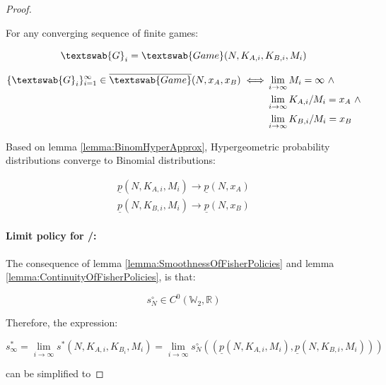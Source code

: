 \documentclass{article}
\theoremstyle{definition}
\begin{document}
\begin{proof}
\label{proof:BinomialFisher}


For any converging sequence of finite games:

\begin{equation}
    \textswab{G}_i = \textswab{Game}(N, K_{A,i}, K_{B,i}, M_i)
\end{equation}

\begin{equation}
    \begin{split}
        \{\textswab{G}_i\}_{i=1}^\infty \in \overline{\textswab{Game}}(N, x_A, x_B) \iff & \lim_{i\to \infty} M_i = \infty \ \wedge \\ 
        & \lim_{i\to \infty} K_{A,i}/M_i = x_A \ \wedge \\
        & \lim_{i\to \infty} K_{B,i}/M_i = x_B
    \end{split}
\end{equation}

Based on lemma \ref{lemma:BinomHyperApprox}, Hypergeometric probability distributions converge to Binomial distributions:

\begin{equation}
    \begin{split}
    \underline{p}(N,K_{A,i},M_i) \to \underline{p}(N,x_A) \\
    \underline{p}(N,K_{B,i},M_i) \to \underline{p}(N,x_B)
    \end{split}
\end{equation}

\paragraph{Limit policy for \PI/:}

The consequence of lemma \ref{lemma:SmoothnessOfFisherPolicies} and lemma \ref{lemma:ContinuityOfFisherPolicies}, is that:

\begin{equation}
    s^\circ_N \in C^0(\mathbb{W}_2,\mathbb{R})
\end{equation}

Therefore, the expression:

\begin{equation}
    s^*_\infty = \lim_{i\to\infty} s^*(N,K_{A,i},K_{B_i},M_i) = 
    \lim_{i\to\infty} s^\circ_N((\underline{p}(N,K_{A,i},M_i),\underline{p}(N,K_{B,i},M_i)))
\end{equation}

can be simplified to


\end{proof}
\end{document}
